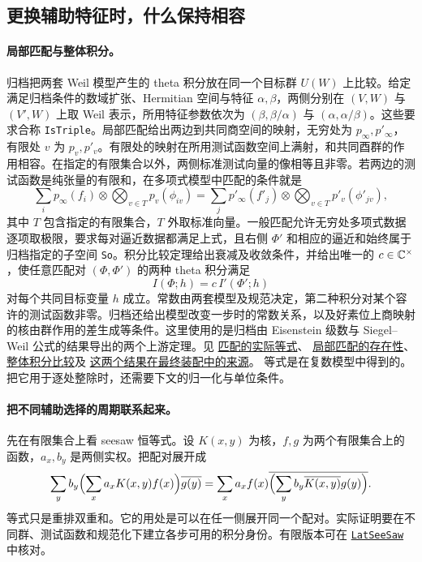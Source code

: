 \documentclass[UTF8,fontset=none,a4paper,11pt]{ctexart}
\theoremstyle{definition}
\newcommand{\src}[3]{\href{https://github.com/leanprover-community/riemann-hypothesis/blob/23aebbb302010b292314d406aa97f7901d698634/src/#1.lean\#L#2}{#3}}
\begin{document}
\subsection{更换辅助特征时，什么保持相容}\label{sec:seesaw}
\paragraph{局部匹配与整体积分。}
归档把两套 Weil 模型产生的 theta 积分放在同一个目标群 $U(W)$ 上比较。给定满足归档条件的数域扩张、Hermitian 空间与特征 $\alpha,\beta$，两侧分别在 $(V,W)$ 与 $(V',W)$ 上取 Weil 表示，所用特征参数依次为 $(\beta,\beta/\alpha)$ 与 $(\alpha,\alpha/\beta)$。这些要求合称 \texttt{IsTriple}。局部匹配给出两边到共同商空间的映射，无穷处为 $p_\infty,p'_\infty$，有限处 $v$ 为 $p_v,p'_v$。有限处的映射在所用测试函数空间上满射，和共同酉群的作用相容。在指定的有限集合以外，两侧标准测试向量的像相等且非零。若两边的测试函数是纯张量的有限和，在多项式模型中匹配的条件就是
\[
 \sum_i p_\infty(f_i)\otimes\bigotimes_{v\in T}p_v(\phi_{iv})
 =
 \sum_j p'_\infty(f'_j)\otimes\bigotimes_{v\in T}p'_v(\phi'_{jv}),
\]
其中 $T$ 包含指定的有限集合，$T$ 外取标准向量。一般匹配允许无穷处多项式数据逐项取极限，要求每对逼近数据都满足上式，且右侧 $\Phi'$ 和相应的逼近和始终属于归档指定的子空间 \texttt{So}。积分比较定理给出衰减及收敛条件，并给出唯一的 $c\in\mathbb C^\times$，使任意匹配对 $(\Phi,\Phi')$ 的两种 theta 积分满足
\[
                           I(\Phi;h)=c\,I'(\Phi';h)
\]
对每个共同目标变量 $h$ 成立。常数由两套模型及规范决定，第二种积分对某个容许的测试函数非零。归档还给出模型改变一步时的常数关系，以及好素位上商映射的核由群作用的差生成等条件。这里使用的是归档由 Eisenstein 级数与 Siegel--Weil 公式的结果导出的两个上游定理。见
\src{Development/AbelianVarietyTheory/BlockTheory/DivisorBase/WeilTensorModels}{474}{匹配的实际等式}、
\src{Development/AbelianVarietyTheory/BlockTheory/DivisorBase/WeilTensorModels}{581}{局部匹配的存在性}、
\src{Development/AbelianVarietyTheory/BlockTheory/DivisorBase/WeilTensorModels}{585}{整体积分比较}及
\src{Development/AutomorphicArithmetic/ThetaCorrespondence/ThetaPairLifts/ThirdPlaceSeries/EveryCharacterOfLiteratureOfVWin}{565}{这两个结果在最终装配中的来源}。
等式是在复数模型中得到的。把它用于逐处整除时，还需要下文的归一化与单位条件。

\paragraph{把不同辅助选择的周期联系起来。}
先在有限集合上看 seesaw 恒等式。设 $K(x,y)$ 为核，$f,g$ 为两个有限集合上的函数，$a_x,b_y$ 是两侧实权。把配对展开成
\[
 \sum_y b_y\Bigl(\sum_x a_xK(x,y)f(x)\Bigr)\overline{g(y)}
 =\sum_x a_x f(x)\overline{\Bigl(\sum_y b_y\overline{K(x,y)}g(y)\Bigr)}.
\]
等式只是重排双重和。它的用处是可以在任一侧展开同一个配对。实际证明要在不同群、测试函数和规范化下建立各步可用的积分身份。有限版本可在
\src{Formalism/ThetaLiftIndependence/Statement}{186}{\texttt{LatSeeSaw}} 中核对。
\end{document}
